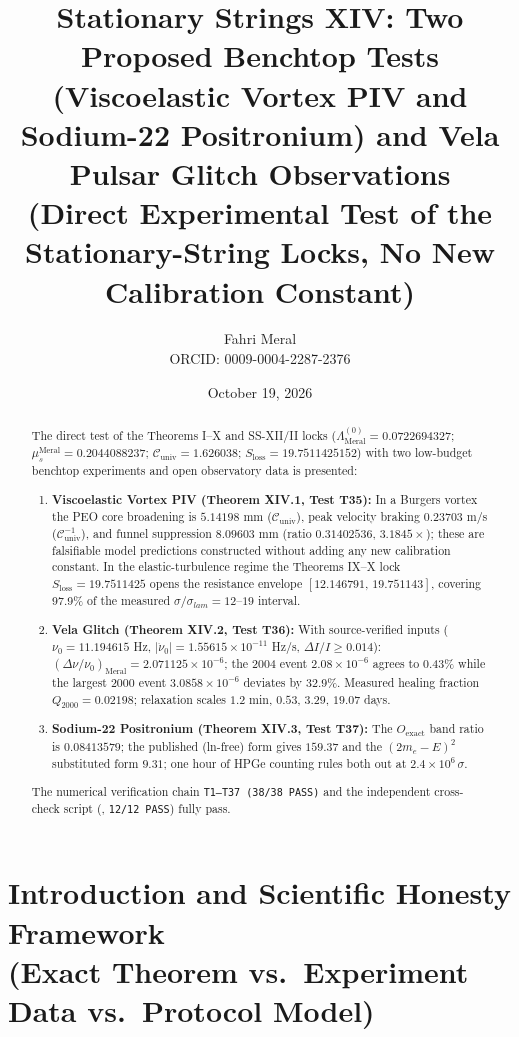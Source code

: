 \documentclass[12pt,a4paper]{article}
\title{\textbf{Stationary Strings XIV: Two Proposed Benchtop Tests (Viscoelastic Vortex PIV and Sodium-22 Positronium) and Vela Pulsar Glitch Observations} \\[0.3cm]
\large (Direct Experimental Test of the Stationary-String Locks, No New Calibration Constant)}
\author{Fahri Meral\\[0.2em]\small ORCID: 0009-0004-2287-2376}
\date{October 19, 2026}
\begin{document}
\maketitle

\begin{abstract}
The direct test of the Theorems I--X and SS-XII/II locks
($\Lambda_{\mathrm{Meral}}^{(0)}=0.0722694327$;
$\mu_s^{\mathrm{Meral}}=0.2044088237$; $\mathcal{C}_{\mathrm{univ}}=1.626038$;
$S_{\mathrm{loss}}=19.7511425152$) with two low-budget benchtop experiments
and open observatory data is presented:
\begin{enumerate}
    \item \textbf{Viscoelastic Vortex PIV (Theorem XIV.1, Test T35):}
    In a Burgers vortex the PEO core broadening is $5.14198$ mm
    ($\mathcal{C}_{\mathrm{univ}}$), peak velocity braking $0.23703$ m/s
    ($\mathcal{C}_{\mathrm{univ}}^{-1}$), and funnel suppression $8.09603$ mm
    (ratio $0.31402536$, $3.1845\times$); these are falsifiable model
    predictions constructed without adding any new calibration constant.
    In the elastic-turbulence regime the Theorems IX--X lock
    $S_{\mathrm{loss}}=19.7511425$ opens the resistance envelope
    $[12.146791,\,19.751143]$, covering 97.9\% of the measured
    $\sigma/\sigma_{lam}=12$--$19$ interval.
    \item \textbf{Vela Glitch (Theorem XIV.2, Test T36):}
    With source-verified inputs ($\nu_0=11.194615$ Hz,
    $|\dot\nu_0|=1.55615\times10^{-11}$ Hz/s, $\Delta I/I\ge 0.014$):
    $(\Delta\nu/\nu_0)_{\mathrm{Meral}}=2.071125\times 10^{-6}$; the 2004
    event $2.08\times10^{-6}$ agrees to 0.43\% while the largest 2000 event
    $3.0858\times10^{-6}$ deviates by 32.9\%. Measured healing fraction
    $Q_{2000}=0.02198$; relaxation scales $1.2$ min, $0.53$, $3.29$, $19.07$ days.
    \item \textbf{Sodium-22 Positronium (Theorem XIV.3, Test T37):}
    The $O_{\mathrm{exact}}$ band ratio is $0.08413579$; the published
    (ln-free) form gives $159.37$ and the $(2m_e-E)^2$ substituted form
    $9.31$; one hour of HPGe counting rules both out at $2.4\times 10^6\,\sigma$.
\end{enumerate}
The numerical verification chain \texttt{T1--T37 (38/38 PASS)} and the
independent cross-check script (, \texttt{12/12 PASS})
fully pass.
\end{abstract}

\section{Introduction and Scientific Honesty Framework \\ (Exact Theorem vs.\ Experiment Data vs.\ Protocol Model)}
\end{document}
